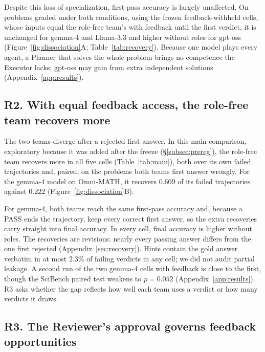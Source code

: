 Despite this loss of specialization, first-pass accuracy is largely
unaffected. On problems graded under both conditions, using the frozen feedback-withheld cells, whose inputs equal the role-free team's with feedback
until the first verdict, it is unchanged for gemma-4 and Llama-3.3 and
higher without roles for gpt-oss (Figure~\ref{fig:dissociation}A;
Table~\ref{tab:recovery}). Because one model plays every agent, a Planner
that solves the whole problem brings no competence the Executor lacks;
gpt-oss may gain from extra independent solutions
(Appendix~\ref{app:results}).

\subsection{R2. With equal feedback access, the role-free team recovers more}
\label{subsec:recovery}



The two teams diverge after a rejected first answer. In this main
comparison, exploratory because it was added after the freeze
(\S\ref{subsec:prereg}), the role-free team recovers more in all five cells (Table~\ref{tab:main}), both over its own failed
trajectories and, paired, on the problems both teams first answer wrongly.
For the gemma-4 model on Omni-MATH, it recovers $0.609$ of its failed
trajectories against $0.222$ (Figure~\ref{fig:dissociation}B).

For gemma-4, both teams reach the same first-pass accuracy and, because a
PASS ends the trajectory, keep every correct first answer, so the extra recoveries carry straight into final accuracy.
In every cell, final accuracy is higher without roles. The recoveries are revisions: nearly every passing
answer differs from the one first rejected (Appendix~\ref{sec:recovery}).
Hints contain the gold answer verbatim in at most $2.3\%$ of failing
verdicts in any cell; we did not audit partial leakage. A second run of the
two gemma-4 cells with feedback is close to the first, though the SciBench
paired test weakens to $p=0.052$ (Appendix~\ref{app:results}). R3 asks
whether the gap reflects how well each team uses a verdict or how many
verdicts it draws.

\subsection{R3. The Reviewer's approval governs feedback opportunities}
\label{subsec:mechanism}

